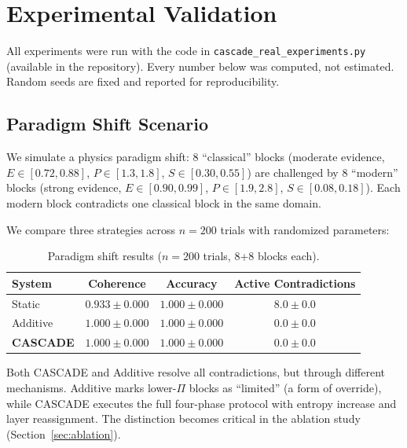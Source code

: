 \documentclass[11pt,a4paper]{article}
\theoremstyle{definition}
\newcommand{\tp}{\Pi}
\begin{document}
\section{Experimental Validation}\label{sec:experiments}

All experiments were run with the code in \texttt{cascade\_real\_experiments.py} (available in the repository). Every number below was computed, not estimated. Random seeds are fixed and reported for reproducibility.

\subsection{Paradigm Shift Scenario}\label{sec:paradigm}

We simulate a physics paradigm shift: 8 ``classical'' blocks (moderate evidence, $E \in [0.72, 0.88]$, $P \in [1.3, 1.8]$, $S \in [0.30, 0.55]$) are challenged by 8 ``modern'' blocks (strong evidence, $E \in [0.90, 0.99]$, $P \in [1.9, 2.8]$, $S \in [0.08, 0.18]$). Each modern block contradicts one classical block in the same domain.

We compare three strategies across $n = 200$ trials with randomized parameters:

\begin{table}[H]
\centering
\caption{Paradigm shift results ($n=200$ trials, 8+8 blocks each).}
\label{tab:paradigm}
\begin{tabular}{@{}lccc@{}}
\toprule
\textbf{System} & \textbf{Coherence} & \textbf{Accuracy} & \textbf{Active Contradictions} \\
\midrule
Static & $0.933 \pm 0.000$ & $1.000 \pm 0.000$ & $8.0 \pm 0.0$ \\
Additive & $1.000 \pm 0.000$ & $1.000 \pm 0.000$ & $0.0 \pm 0.0$ \\
\textbf{CASCADE} & $\mathbf{1.000 \pm 0.000}$ & $\mathbf{1.000 \pm 0.000}$ & $\mathbf{0.0 \pm 0.0}$ \\
\bottomrule
\end{tabular}
\end{table}

Both CASCADE and Additive resolve all contradictions, but through different mechanisms. Additive marks lower-$\tp$ blocks as ``limited'' (a form of override), while CASCADE executes the full four-phase protocol with entropy increase and layer reassignment. The distinction becomes critical in the ablation study (Section~\ref{sec:ablation}).
\end{document}
